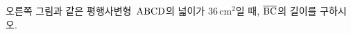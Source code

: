 \noindent\begin{minipage}[t]{0.58\linewidth}\vspace{0pt}\raggedright 오른쪽 그림과 같은 평행사변형~$\mathrm{ABCD}$의 넓이가 $36\,\mathrm{cm}^2$일 때, $\overline{\mathrm{BC}}$의 길이를 구하시오.\end{minipage}\hfill\begin{minipage}[t]{0.4\linewidth}\vspace{0pt}\centering \resizebox{\ifdim\width>\linewidth\linewidth\else\width\fi}{!}{}\end{minipage}\par
